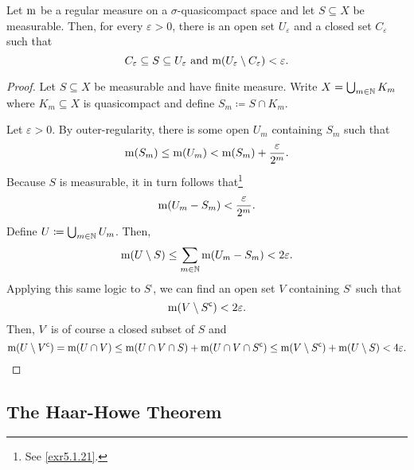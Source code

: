 \begin{prp}
Let $\mathrm{m}$ be a regular measure on a $\sigma$-quasicompact space and let $S\subseteq X$ be measurable.  Then, for every $\varepsilon >0$, there is an open set $U_{\varepsilon}$ and a closed set $C_{\varepsilon}$ such that
\begin{equation}
C_{\varepsilon}\subseteq S\subseteq U_{\varepsilon}\text{ and }\mathrm{m} (U_{\varepsilon}\setminus C_{\varepsilon})<\varepsilon .
\end{equation}
\begin{proof}
Let $S\subseteq X$ be measurable and have finite measure.  Write $X=\bigcup _{m\in \mathbb{N}}K_m$ where $K_m\subseteq X$ is quasicompact and define $S_m\coloneqq S\cap K_m$.

Let $\varepsilon >0$.  By outer-regularity, there is some open $U_m$ containing $S_m$ such that
\begin{equation}
\mathrm{m} (S_m)\leq \mathrm{m} (U_m)<\mathrm{m} (S_m)+\frac{\varepsilon}{2^m}.
\end{equation}
Because $S$ is measurable, it in turn follows that\footnote{See \cref{exr5.1.21}.}
\begin{equation}
\mathrm{m} (U_m-S_m)<\frac{\varepsilon}{2^m}.
\end{equation}
Define $U\coloneqq \bigcup _{m\in \mathbb{N}}U_m$.  Then,
\begin{equation}
\mathrm{m} (U\setminus S)\leq \sum _{m\in \mathbb{N}}\mathrm{m} (U_m-S_m)<2\varepsilon .
\end{equation}
Applying this same logic to $S^{\comp}$, we can find an open set $V$ containing $S^{\comp}$ such that
\begin{equation}
\mathrm{m} (V\setminus S^{\mathsf{c} })<2\varepsilon .
\end{equation}
Then, $V^{\comp}$ is of course a closed subset of $S$ and
\begin{equation}
\mathrm{m} (U\setminus V^{\mathsf{c}})=\mathrm{m} (U\cap V)\leq \mathrm{m} (U\cap V\cap S)+\mathrm{m} (U\cap V\cap S^{\mathsf{c}})\leq \mathrm{m} (V\setminus S^{\mathsf{c}})+\mathrm{m} (U\setminus S)<4\varepsilon .
\end{equation}
\end{proof}
\end{prp}

\subsection{The Haar-Howe Theorem}

